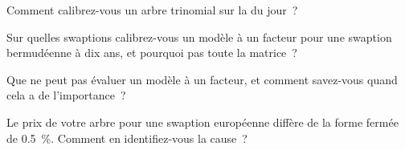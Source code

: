 \begin{interviewq}\label{iq:rc:short-rate-models:3}
Comment calibrez-vous un arbre trinomial sur la  du jour~?
\end{interviewq}

\begin{interviewq}\label{iq:rc:short-rate-models:4}
Sur quelles swaptions calibrez-vous un modèle à un facteur pour une swaption bermudéenne
à dix ans, et pourquoi pas toute la matrice~?
\end{interviewq}

\begin{interviewq}\label{iq:rc:short-rate-models:5}
Que ne peut pas évaluer un modèle à un facteur, et comment savez-vous quand cela a de l'importance~?
\end{interviewq}

\begin{interviewq}\label{iq:rc:short-rate-models:6}
Le prix de votre arbre pour une swaption européenne diffère de la forme fermée de 0.5~\%.
Comment en identifiez-vous la cause~?
\end{interviewq}
